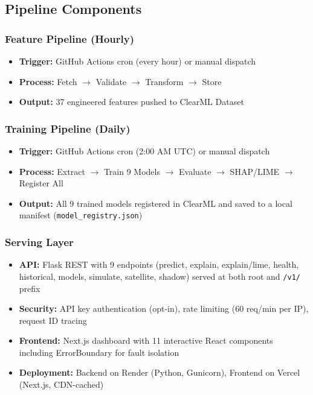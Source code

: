\documentclass[12pt, a4paper, oneside]{article}
\begin{document}
\subsection{Pipeline Components}

\subsubsection{Feature Pipeline (Hourly)}
\begin{itemize}
    \item \textbf{Trigger:} GitHub Actions cron (every hour) or manual dispatch
    \item \textbf{Process:} Fetch $\rightarrow$ Validate $\rightarrow$ Transform $\rightarrow$ Store
    \item \textbf{Output:} 37 engineered features pushed to ClearML Dataset
\end{itemize}

\subsubsection{Training Pipeline (Daily)}
\begin{itemize}
    \item \textbf{Trigger:} GitHub Actions cron (2:00 AM UTC) or manual dispatch
    \item \textbf{Process:} Extract $\rightarrow$ Train 9 Models $\rightarrow$ Evaluate $\rightarrow$ SHAP/LIME $\rightarrow$ Register All
    \item \textbf{Output:} All 9 trained models registered in ClearML and saved to a local manifest (\texttt{model\_registry.json})
\end{itemize}

\subsubsection{Serving Layer}
\begin{itemize}
    \item \textbf{API:} Flask REST with 9 endpoints (predict, explain, explain/lime, health, historical, models, simulate, satellite, shadow) served at both root and \texttt{/v1/} prefix
    \item \textbf{Security:} API key authentication (opt-in), rate limiting (60 req/min per IP), request ID tracing
    \item \textbf{Frontend:} Next.js dashboard with 11 interactive React components including ErrorBoundary for fault isolation
    \item \textbf{Deployment:} Backend on Render (Python, Gunicorn), Frontend on Vercel (Next.js, CDN-cached)
\end{itemize}
\end{document}
